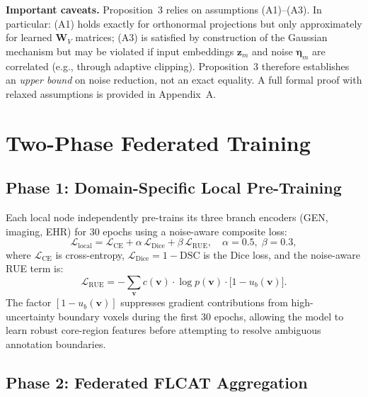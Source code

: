 \documentclass[a4paper,fleqn]{cas-dc}
\begin{document}
\textbf{Important caveats.}
Proposition~3 relies on assumptions (A1)--(A3). In particular:
(A1) holds exactly for orthonormal projections but only approximately for
learned $\mathbf{W}_V$ matrices; (A3) is satisfied by construction of the
Gaussian mechanism but may be violated if input embeddings $\mathbf{z}_m$ and
noise $\boldsymbol{\eta}_m$ are correlated (e.g., through adaptive clipping).
Proposition~3 therefore establishes an \emph{upper bound} on noise reduction,
not an exact equality. A full formal proof with relaxed assumptions is provided
in Appendix~A.

\section{Two-Phase Federated Training}
\label{sec:training}

\subsection{Phase 1: Domain-Specific Local Pre-Training}

Each local node independently pre-trains its three branch encoders (GEN,
imaging, EHR) for 30 epochs using a noise-aware composite loss:
\begin{equation}
\mathcal{L}_{\mathrm{local}} =
\mathcal{L}_{\mathrm{CE}} + \alpha\,\mathcal{L}_{\mathrm{Dice}} +
\beta\,\mathcal{L}_{\mathrm{RUE}},\quad \alpha\!=\!0.5,\;\beta\!=\!0.3,
\label{eq:local_loss}
\end{equation}
where $\mathcal{L}_{\mathrm{CE}}$ is cross-entropy, $\mathcal{L}_{\mathrm{Dice}}
= 1 - \mathrm{DSC}$ is the Dice loss, and the noise-aware RUE term is:
\begin{equation}
\mathcal{L}_{\mathrm{RUE}} =
-\sum_{\mathbf{v}} c(\mathbf{v})\cdot\log p(\mathbf{v})\cdot
\bigl[1 - u_b(\mathbf{v})\bigr].
\label{eq:rue_loss}
\end{equation}
The factor $[1\!-\!u_b(\mathbf{v})]$ suppresses gradient contributions from
high-uncertainty boundary voxels during the first 30 epochs, allowing the
model to learn robust core-region features before attempting to resolve
ambiguous annotation boundaries.

\subsection{Phase 2: Federated FLCAT Aggregation}
\end{document}
